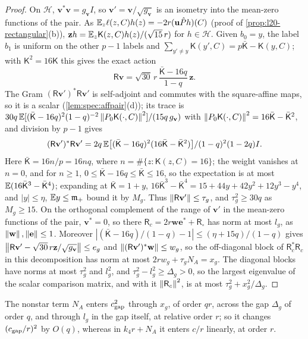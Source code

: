 \begin{proof}
On $\mathcal H$, $\mathbf v^*\mathbf v=g_{\mathbf v}I$, so
$\mathbf v'=\mathbf v/\sqrt{g_{\mathbf v}}$ is an isometry into the mean-zero
functions of the pair. As $\mathbb E_z\ell(z,C)h(z)=-2r(\mathbf u\hat P h)(C)$ (proof of
\cref{prop:l20-rectangular}(b)), $\mathbf zh=\mathbb E_z\mathsf K(z,C)h(z)/(\sqrt{15}\,r)$
for $h\in\mathcal H$. Given $b_0=y$, the label $b_1$ is uniform on the other $p-1$
labels and $\sum_{y'\ne y}\mathsf K(y',C)=p\bar{\mathsf K}-\mathsf K(y,C)$; with
$\mathsf K^2=16\mathsf K$ this gives the exact action
\[
 \mathsf R\mathbf v=\sqrt{30}\,r\,\frac{\bar{\mathsf K}-16q}{1-q}\,\mathbf z .
\]
The Gram $(\mathsf R\mathbf v')^*\mathsf R\mathbf v'$ is self-adjoint and commutes
with the square-affine maps, so it is a scalar (\cref{lem:spec:affpair}(d)); its
trace is $30q\,\mathbb E[(\bar{\mathsf K}-16q)^2(1-q)^{-2}\left\|P_0\mathsf K(\cdot,C)\right\|^2]
/(15q\,g_{\mathbf v})$ with $\left\|P_0\mathsf K(\cdot,C)\right\|^2=16\bar{\mathsf K}-\bar{\mathsf K}^2$,
and division by $p-1$ gives
\[
 (\mathsf R\mathbf v')^*\mathsf R\mathbf v'
 =2q\,\mathbb E\bigl[(\bar{\mathsf K}-16q)^2(16\bar{\mathsf K}-\bar{\mathsf K}^2)\bigr]/(1-q)^2(1-2q)I .
\]
Here $\bar{\mathsf K}=16n/p=16nq$, where $n=\#\{z:\mathsf K(z,C)=16\}$; the
weight vanishes at $n=0$,
and for $n\ge1$, $0\le\bar{\mathsf K}-16q\le\bar{\mathsf K}\le16$, so the
expectation is at most $\mathbb E(16\bar{\mathsf K}^3-\bar{\mathsf K}^4)$; expanding at
$\bar{\mathsf K}=1+y$, $16\bar{\mathsf K}^3-\bar{\mathsf K}^4=15+44y+42y^2+12y^3-y^4$,
and $|y|\le\eta$, $\mathbb E y\le\mathfrak m_+$ bound it by $M_g$. Thus
$\left\|\mathsf R\mathbf v'\right\|\le\tau_g$, and $\tau_g^2\ge30q$ as $M_g\ge15$. On the
orthogonal complement of the range of $\mathbf v'$ in the mean-zero functions of
the pair, $\mathbf v^*=0$, so there $\mathsf R_c=2r\mathbf w\mathbf e^*+\mathsf R_\circ$
has norm at most $l_g$, as $\left\|\mathbf w\right\|,\left\|\mathbf e\right\|\le1$. Moreover
$|(\bar{\mathsf K}-16q)/(1-q)-1|\le(\eta+15q)/(1-q)$ gives
$\left\|\mathsf R\mathbf v'-\sqrt{30}\,r\mathbf z/\sqrt{g_{\mathbf v}}\right\|\le e_g$ and
$\left\|(\mathsf R\mathbf v')^*\mathbf w\right\|\le w_g$, so the off-diagonal block of
$\mathsf R_c^*\mathsf R_c$ in this decomposition has norm at most
$2rw_g+\tau_gN_A=x_g$. The diagonal blocks have norms at most $\tau_g^2$ and
$l_g^2$, and $\tau_g^2-l_g^2\ge\Delta_g>0$, so the largest eigenvalue of the
scalar comparison matrix, and with it $\left\|\mathsf R_c\right\|^2$, is at most
$\tau_g^2+x_g^2/\Delta_g$.
\end{proof}

The nonstar term $N_A$ enters $c_{\rm gap}^2$ through $x_g$, of order $qr$,
across the gap $\Delta_g$ of order $q$, and through $l_g$ in the gap itself, at
relative order $r$; so it changes $(c_{\rm gap}/r)^2$ by $O(q)$, whereas in
$k_4r+N_A$ it enters $c/r$ linearly, at order $r$.

